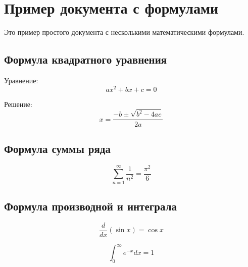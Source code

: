 \documentclass{article}
\begin{document}
\section*{Пример документа с формулами}

Это пример простого документа с несколькими математическими формулами.

\subsection*{Формула квадратного уравнения}

Уравнение:
\[
ax^2 + bx + c = 0
\]

Решение:
\[
x = \frac{-b \pm \sqrt{b^2 - 4ac}}{2a}
\]

\subsection*{Формула суммы ряда}

\[
\sum_{n=1}^{\infty} \frac{1}{n^2} = \frac{\pi^2}{6}
\]

\subsection*{Формула производной и интеграла}

\[
\frac{d}{dx} \left( \sin x \right) = \cos x
\]

\[
\int_0^{\infty} e^{-x} dx = 1
\]
\end{document}
